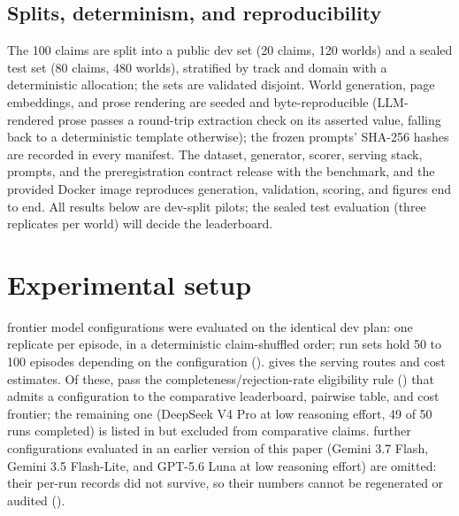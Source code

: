 \documentclass{article}
\begin{document}
\subsection{Splits, determinism, and reproducibility}
\label{sec:splits}

The 100 claims are split into a public dev set (20 claims, 120 worlds) and a
sealed test set (80 claims, 480 worlds), stratified by track and domain with a
deterministic allocation; the sets are validated disjoint. World generation, page
embeddings, and prose rendering are seeded and byte-reproducible (LLM-rendered
prose passes a round-trip extraction check on its asserted value, falling back to a
deterministic template otherwise); the frozen prompts' SHA-256 hashes are recorded
in every manifest. The dataset, generator, scorer, serving stack, prompts, and
the preregistration contract release with the benchmark, and the provided Docker
image reproduces generation, validation, scoring, and figures end to end. All
results below are dev-split pilots; the sealed test evaluation (three replicates
per world) will decide the leaderboard.


\section{Experimental setup}
\label{sec:setup}

\RosterSize{} frontier model configurations were evaluated on the identical dev plan: one
replicate per episode, in a deterministic claim-shuffled order; run sets hold 50 to 100
episodes depending on the configuration (). 
gives the serving routes and cost estimates. Of these, \FieldSize{} pass the
completeness/rejection-rate eligibility rule () that admits a
configuration to the comparative leaderboard, pairwise table, and cost frontier; the
remaining one (DeepSeek V4 Pro at low reasoning effort, 49 of 50 runs completed) is
listed in  but excluded from comparative claims. \LostSize{} further
configurations evaluated in an earlier version of this paper (Gemini 3.7 Flash,
Gemini 3.5 Flash-Lite, and GPT-5.6 Luna at low reasoning effort) are omitted: their
per-run records did not survive, so their numbers cannot be regenerated or audited
().
\end{document}
